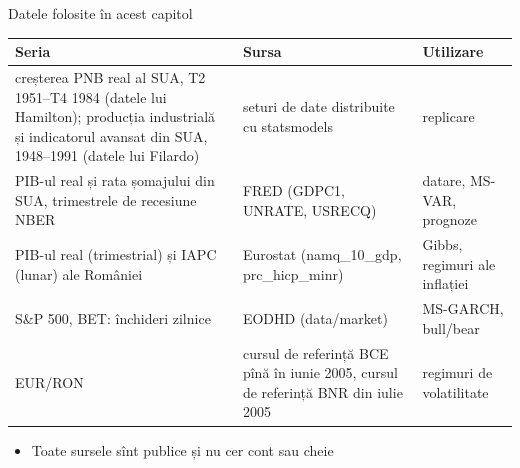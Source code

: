 \begin{frame}{Datele folosite în acest capitol}
\itemsize{\footnotesize}
\begin{center}
\scriptsize
\begin{tabular}{>{\raggedright\arraybackslash}p{5.0cm}>{\raggedright\arraybackslash}p{4.4cm}>{\raggedright\arraybackslash}p{2.6cm}}
\toprule
\textbf{Seria} & \textbf{Sursa} & \textbf{Utilizare} \\
\midrule
creșterea PNB real al SUA, T2 1951--T4 1984 (datele lui Hamilton); producția industrială și indicatorul avansat din SUA, 1948--1991 (datele lui Filardo) & seturi de date distribuite cu statsmodels & replicare \\
PIB-ul real și rata șomajului din SUA, trimestrele de recesiune NBER & FRED (GDPC1, UNRATE, USRECQ) & datare, MS-VAR, prognoze \\
PIB-ul real (trimestrial) și IAPC (lunar) ale României & Eurostat (namq\_10\_gdp, prc\_hicp\_minr) & Gibbs, regimuri ale inflației \\
S\&P 500, BET: închideri zilnice & EODHD (data/market) & MS-GARCH, bull/bear \\
EUR/RON & cursul de referință BCE pînă în iunie 2005, cursul de referință BNR din iulie 2005 & regimuri de volatilitate \\
\bottomrule
\end{tabular}
\end{center}
\begin{itemize}
    \item Toate sursele sînt publice și nu cer cont sau cheie
\end{itemize}
\end{frame}

